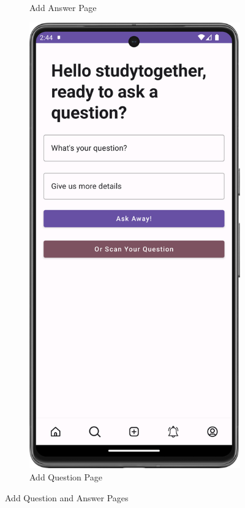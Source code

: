 \begin{figure}[H]
\begin{subfigure}[b]{0.5\textwidth}
    \caption{Add Answer Page}
    \label{fig:add_answer}
  \end{subfigure}
  \hfill
  \begin{subfigure}[b]{0.5\textwidth}
    \includegraphics[width=\textwidth]{Figures/Product_Images/Questions_Answers/add_question.png}
    \caption{Add Question Page}
    \label{fig:add_question}
  \end{subfigure}
  \caption{Add Question and Answer Pages}
\end{figure}




